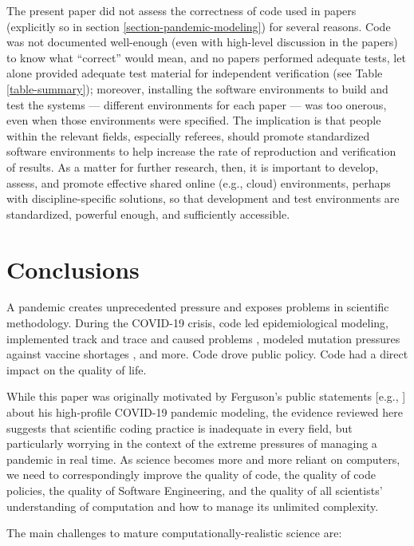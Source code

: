 \documentclass{comjnl}
\def\citeeg#1{[e.g., \citenum{#1}]}
\begin{document}
The present paper did not assess the correctness of code used in papers (explicitly so in section \ref{section-pandemic-modeling}) for several reasons. Code was not documented well-enough (even with high-level discussion in the papers) to know what ``correct'' would mean, and no papers performed adequate tests, let alone provided adequate test material for independent verification (see Table \ref{table-summary}); moreover, installing the software environments to build and test the systems --- different environments for each paper --- was too onerous, even when those environments were specified. The implication is that people within the relevant fields, especially referees, should promote standardized software environments to help increase the rate of reproduction and verification of results. As a matter for further research, then, it is important to develop, assess, and promote effective shared online (e.g., cloud) environments, perhaps with discipline-specific solutions, so that development and test environments are standardized, powerful enough, and sufficiently accessible.

\section{Conclusions}
A pandemic creates unprecedented pressure and exposes problems in scientific methodology. During the COVID-19 crisis, code led epidemiological modeling, implemented track and trace and caused problems \cite{excel-fiasco}, modeled mutation pressures against vaccine shortages \cite{science-delays}, and more. Code drove public policy. Code had a direct impact on the quality of life. 

While this paper was originally motivated by Ferguson's public statements \citeeg{tweet,ferguson-interview} about his high-profile COVID-19 pandemic modeling, the evidence reviewed here suggests that scientific coding practice is inadequate in every field, but particularly worrying in the context of the extreme pressures of managing a pandemic in real time. As science becomes more and more reliant on computers, we need to correspondingly improve the quality of code, the quality of code policies, the quality of Software Engineering, and the quality of all scientists' understanding of computation and how to manage its unlimited complexity. 

The main challenges to mature computationally-realistic science are:
\end{document}
